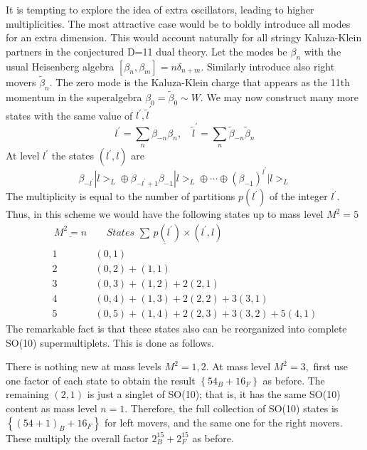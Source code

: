 It is tempting to explore the idea of extra oscillators, leading to higher
multiplicities. The most attractive case would be to boldly introduce all
modes for an extra dimension. This would account naturally for all stringy
Kaluza-Klein partners in the conjectured D=11 dual theory. Let the modes be $%
\beta _n$ with the usual Heisenberg algebra $[\beta _n,\beta _m]=n\delta
_{n+m}.$ Similarly introduce also right movers $\tilde \beta _n.$ The zero
mode is the Kaluza-Klein charge that appears as the 11th momentum in the
superalgebra $\beta _0=\tilde \beta _0\sim W.$ We may now construct many
more states with the same value of $l^{\prime },\tilde l^{\prime }$%
\begin{equation}
l^{\prime }=\sum_n\beta _{-n}\beta _n,\quad \tilde l^{\prime }=\sum_n\tilde
\beta _{-n}\tilde \beta _n
\end{equation}
At level $l^{\prime }$ the states $(l^{\prime },l)$ are
\begin{equation}
\beta _{-l^{\prime }}|l>_L\oplus \beta _{-l^{\prime }+1}\beta
_{-1}|l>_L\oplus \cdots \oplus \left( \beta _{-1}\right) ^{l^{\prime }}|l>_L
\end{equation}
The multiplicity is equal to the number of partitions $p(l^{\prime })$ of
the integer $l^{\prime }.$ Thus, in this scheme we would have the following
states up to mass level $M^2=5$%
\begin{equation}
\begin{array}{ll}
\,\underline{M^2=n} & \,\quad \underline{States\,\,\sum \,p(l^{\prime
})\times (l^{\prime },l)} \\
1 & (0,1) \\
2 & (0,2)+(1,1) \\
3 & (0,3)+(1,2)+2(2,1) \\
4 & (0,4)+(1,3)+2(2,2)+3(3,1) \\
5 & (0,5)+(1,4)+2(2,3)+3(3,2)+5(4,1)
\end{array}
\label{mul}
\end{equation}
The remarkable fact is that these states also can be reorganized into
complete SO(10) supermultiplets. This is done as follows.

There is nothing new at mass levels $M^2=1,2.$ At mass level $M^2=3,$ first
use one factor of each state to obtain the result $\left\{ 54_B+16_F\right\}
$ as before. The remaining $(2,1)$ is just a singlet of SO(10); that is, it
has the same SO(10) content as mass level $n=1$. Therefore, the full
collection of SO(10) states is $\left\{ \left( 54+1\right) _B+16_F\right\} $
for left movers, and the same one for the right movers. These multiply the
overall factor $2_B^{15}+2_F^{15}$ as before.


